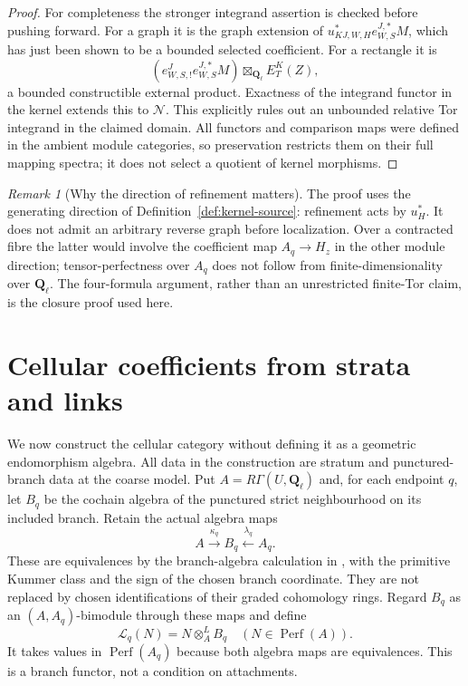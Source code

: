 \documentclass[11pt]{article}
\theoremstyle{definition}
\theoremstyle{remark}
\newtheorem{remark}[proposition]{Remark}
\newcommand{\Q}{\mathbf Q_\ell}
\newcommand{\Perf}{\operatorname{Perf}}
\begin{document}
\begin{proof}
For completeness the stronger integrand assertion is checked before
pushing forward.  For a graph it is the graph extension of
$u_{KJ,W,H}^*e^{J,*}_{W,S}M$, which has just been shown to be a
bounded selected coefficient.  For a rectangle it is
\[
 (e^J_{W,S,!}e^{J,*}_{W,S}M)\boxtimes_{\Q}E^K_T(Z),
\]
a bounded constructible external product.  Exactness of the integrand
functor in the kernel extends this to $\mathcal N$.  This explicitly
rules out an unbounded relative Tor integrand in the claimed domain.
All functors and comparison maps were defined in the ambient module
categories, so preservation restricts them on their full mapping
spectra; it does not select a quotient of kernel morphisms.
\end{proof}

\begin{remark}[Why the direction of refinement matters]
The proof uses the generating direction of
Definition~\ref{def:kernel-source}: refinement acts by $u_H^*$.
It does not admit an arbitrary reverse graph before localization.
Over a contracted fibre the latter would involve the coefficient map
$A_q\to H_z$ in the other module direction; tensor-perfectness over
$A_q$ does not follow from finite-dimensionality over $\Q$.
The four-formula argument, rather than an unrestricted finite-Tor
claim, is the closure proof used here.
\end{remark}

\section{Cellular coefficients from strata and links}
\label{sec:cellular}
We now construct the cellular category without defining it as a
geometric endomorphism algebra.  All data in the construction are
stratum and punctured-branch data at the coarse model.
Put $A=R\Gamma(U,\Q)$ and, for each endpoint $q$, let $B_q$ be
the cochain algebra of the punctured strict neighbourhood on its
included branch.  Retain the actual algebra maps
\[
 A\xrightarrow{\kappa_q}B_q\xleftarrow{\lambda_q}A_q.
\]
These are equivalences by the branch-algebra calculation in
\cite{Refinement}, with the primitive Kummer class and the sign of
the chosen branch coordinate.  They are not replaced by chosen
identifications of their graded cohomology rings.
Regard $B_q$ as an $(A,A_q)$-bimodule through these maps and define
\[
 \mathcal L_q(N)=N\otimes_A^L B_q\quad(N\in\Perf(A)).
\]
It takes values in $\Perf(A_q)$ because both algebra maps are
equivalences.  This is a branch functor, not a condition on attachments.
\end{document}
